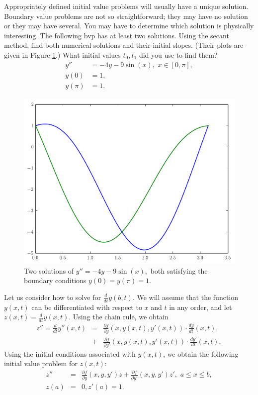 \begin{problem} 
Appropriately defined initial value problems will usually have a unique solution.
Boundary value problems are not so straightforward; they may have no solution or they may have several.
You may have to determine which solution is physically interesting.
The following bvp has at least two solutions.
Using the secant method, find both numerical solutions and their initial slopes.
(Their plots are given in Figure \ref{prob:shooting1}.)
What initial values $t_0, t_1$ did you use to find them?
\begin{equation*}
\begin{split}
y'' &= -4y -9\sin(x), \,\, x \in [0,\pi],\\
y(0) &= 1, \\
y(\pi) &=1.
\end{split}
\end{equation*}

\begin{figure}[H]
\includegraphics[width=\textwidth]{Fig1.pdf}
\caption{Two solutions of $y'' = -4y -9\sin(x),$ both satisfying the boundary conditions $y(0) = y(\pi) = 1.$}
\label{prob:shooting1}
\end{figure}
\end{problem}

Let us consider how to solve for $\frac{d}{dt} y(b,t)$.
We will assume that the function $y(x,t)$ can be differentiated with respect to $x$ and $t$ in any order, and let  $z(x,t) = \frac{d}{dt} y(x,t).$
Using the chain rule, we obtain 
\begin{eqnarray*}
z'' = \frac{d}{dt} y''(x,t) &=& \frac{\partial f}{\partial y} (x,y(x,t),y'(x,t)) \cdot \frac{dy}{dt}(x,t) ,\\
&+& \frac{\partial f}{\partial y'} (x,y(x,t),y'(x,t)) \cdot \frac{dy'}{dt}(x,t),
\end{eqnarray*}
Using the initial conditions associated with $y(x,t)$, we obtain the following initial value problem for $z(x,t)$: 
\begin{eqnarray*}
z'' &=& \frac{\partial f}{\partial y} (x,y,y') z + \frac{\partial f}{\partial y'} (x,y,y') z'
,\,\,a \leq x \leq b, \\
 z(a) &=& 0, z'(a) = 1.
\end{eqnarray*}

